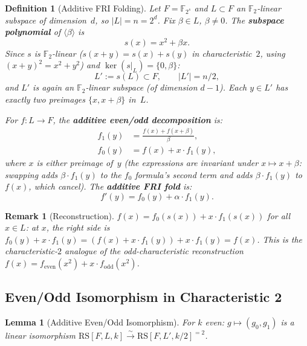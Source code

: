 \documentclass[11pt]{article}
\newtheorem{lemma}[theorem]{Lemma}
\newtheorem{definition}[theorem]{Definition}
\newtheorem{remark}[theorem]{Remark}
\newcommand{\FF}{\mathbb{F}}
\newcommand{\RS}{\mathrm{RS}}
\begin{document}
\begin{definition}[Additive FRI Folding]
\label{def:additive-folding}
Let $F = \FF_{2^s}$ and $L \subset F$ an $\FF_2$-linear subspace of dimension~$d$, so $|L| = n = 2^d$. Fix $\beta \in L$, $\beta \neq 0$. The \textbf{subspace polynomial} of $\langle\beta\rangle$ is
$$s(x) = x^2 + \beta x.$$
Since $s$ is $\FF_2$-linear ($s(x{+}y) = s(x) + s(y)$ in characteristic~$2$, using $(x{+}y)^2 = x^2 + y^2$) and $\ker(s|_L) = \{0, \beta\}$:
$$L' := s(L) \subset F, \qquad |L'| = n/2,$$
and $L'$ is again an $\FF_2$-linear subspace (of dimension $d{-}1$). Each $y \in L'$ has exactly two preimages $\{x, x{+}\beta\}$ in~$L$.

For $f: L \to F$, the \textbf{additive even/odd decomposition} is:
\begin{align*}
f_1(y) &= \frac{f(x) + f(x{+}\beta)}{\beta}, \\
f_0(y) &= f(x) + x \cdot f_1(y),
\end{align*}
where $x$ is either preimage of~$y$ (the expressions are invariant under $x \mapsto x{+}\beta$: swapping adds $\beta \cdot f_1(y)$ to the $f_0$ formula's second term and adds $\beta \cdot f_1(y)$ to $f(x)$, which cancel). The \textbf{additive FRI fold} is:
$$f'(y) = f_0(y) + \alpha \cdot f_1(y).$$
\end{definition}

\begin{remark}[Reconstruction]
\label{rem:additive-reconstruction}
$f(x) = f_0(s(x)) + x \cdot f_1(s(x))$ for all $x \in L$: at $x$, the right side is $f_0(y) + x \cdot f_1(y) = (f(x) + x \cdot f_1(y)) + x \cdot f_1(y) = f(x)$. This is the characteristic-$2$ analogue of the odd-characteristic reconstruction $f(x) = f_{\mathrm{even}}(x^2) + x \cdot f_{\mathrm{odd}}(x^2)$.
\end{remark}

\subsection{Even/Odd Isomorphism in Characteristic 2}

\begin{lemma}[Additive Even/Odd Isomorphism]
\label{lem:additive-iso}
For $k$ even: $g \mapsto (g_0, g_1)$ is a linear isomorphism $\RS[F, L, k] \xrightarrow{\sim} \RS[F, L', k/2]^{=2}$.
\end{lemma}
\end{document}
